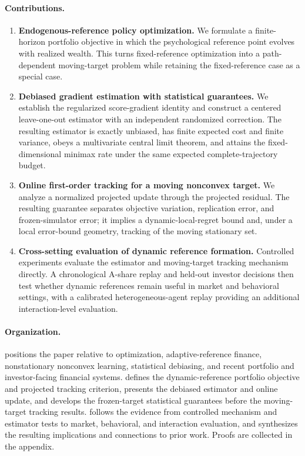 \paragraph{Contributions.}
\begin{enumerate}[leftmargin=2em]
\item \textbf{Endogenous-reference \CPT policy optimization.}  We formulate a finite-horizon portfolio objective in which the psychological reference point evolves with realized wealth.  This turns fixed-reference \CPT optimization into a path-dependent moving-target problem while retaining the fixed-reference case as a special case.
\item \textbf{Debiased gradient estimation with statistical guarantees.}  We establish the regularized \CPT score-gradient identity and construct a centered leave-one-out estimator with an independent randomized correction.  The resulting estimator is exactly unbiased, has finite expected cost and finite variance, obeys a multivariate central limit theorem, and attains the fixed-dimensional minimax rate under the same expected complete-trajectory budget.
\item \textbf{Online first-order tracking for a moving nonconvex target.}  We analyze a normalized projected update through the projected residual.  The resulting guarantee separates objective variation, replication error, and frozen-simulator error; it implies a dynamic-local-regret bound and, under a local error-bound geometry, tracking of the moving stationary set.
\item \textbf{Cross-setting evaluation of dynamic reference formation.}  Controlled experiments evaluate the estimator and moving-target tracking mechanism directly.  A chronological A-share replay and held-out investor decisions then test whether dynamic references remain useful in market and behavioral settings, with a calibrated heterogeneous-agent replay providing an additional interaction-level evaluation.
\end{enumerate}

\paragraph{Organization.}
 positions the paper relative to \CPT optimization, adaptive-reference finance, nonstationary nonconvex learning, statistical debiasing, and recent portfolio and investor-facing financial systems.   defines the dynamic-reference portfolio objective and projected tracking criterion,  presents the debiased estimator and online update, and  develops the frozen-target statistical guarantees before the moving-target tracking results.   follows the evidence from controlled mechanism and estimator tests to market, behavioral, and interaction evaluation, and  synthesizes the resulting implications and connections to prior work.  Proofs are collected in the appendix.
